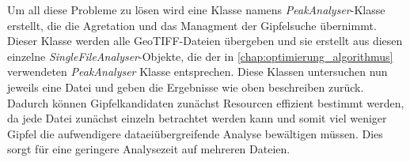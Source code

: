 Um all diese Probleme zu lösen wird eine Klasse namens \textit{PeakAnalyser}-Klasse erstellt, die die Agretation und das Managment der Gipfelsuche übernimmt. Dieser Klasse werden alle GeoTIFF-Dateien übergeben und sie erstellt aus diesen einzelne \textit{SingleFileAnalyser}-Objekte, die der in \ref{chap:optimierung_algorithmus} verwendeten \textit{PeakAnalyser} Klasse entsprechen.  Diese Klassen untersuchen nun jeweils eine Datei und geben die Ergebnisse wie oben beschreiben zurück. Dadurch können Gipfelkandidaten zunächst Resourcen effizient bestimmt werden, da jede Datei zunächst einzeln betrachtet werden kann und somit viel weniger Gipfel die aufwendigere dataeiübergreifende Analyse bewältigen müssen. Dies sorgt für eine geringere Analysezeit auf mehreren Dateien.
